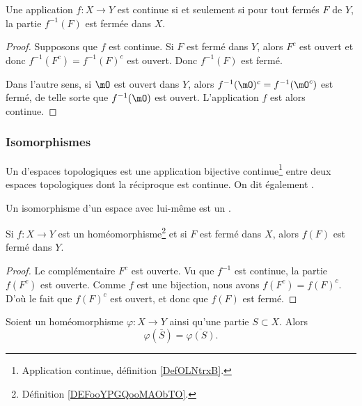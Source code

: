 \begin{lemma}       \label{LEMooATLRooEKnlro}
	Une application \( f\colon X\to Y\) est continue si et seulement si pour tout fermés \( F\) de \( Y\), la partie \(f^{-1}(F) \) est fermée dans \( X\).
\end{lemma}

\begin{proof}
	Supposons que \( f\) est continue. Si \( F\) est fermé dans \( Y\), alors \( F^c\) est ouvert et donc \( f^{-1}(F^c)=f^{-1}(F)^c\) est ouvert. Donc \( f^{-1}(F)\) est fermé.

	Dans l'autre sens, si \( \mO\) est ouvert dans \( Y\), alors \( f^{-1}(\mO)^c=f^{-1}(\mO^c)\) est fermé, de telle sorte que \( f^{-1}(\mO)\) est ouvert. L'application \( f\) est alors continue.
\end{proof}


\subsubsection{Isomorphismes}

\begin{definition}      \label{DEFooYPGQooMAObTO}
	Un  d'espaces topologiques est une application bijective continue\footnote{Application continue, définition \ref{DefOLNtrxB}.} entre deux espaces topologiques dont la réciproque est continue. On dit également .

	Un isomorphisme d'un espace avec lui-même est un .
\end{definition}


\begin{lemma}        \label{LEMooMJSHooOszteq}
	Si \( f\colon X\to Y\) est un homéomorphisme\footnote{Définition \ref{DEFooYPGQooMAObTO}.} et si \( F\) est fermé dans \( X\), alors \( f(F)\) est fermé dans \( Y\).
\end{lemma}

\begin{proof}
	Le complémentaire \( F^c\) est ouverte. Vu que \( f^{-1}\) est continue, la partie \( f(F^c)\) est ouverte. Comme \( f\) est une bijection, nous avons \( f(F^c)=f(F)^c\). D'où le fait que \( f(F)^c\) est ouvert, et donc que \( f(F)\) est fermé.
\end{proof}


\begin{lemma}		\label{LEMooNMPGooRlgppQ}
	Soient un homéomorphisme \(\varphi \colon X\to Y  \) ainsi qu'une partie \( S\subset X\). Alors
	\begin{equation}
		\varphi(\bar S)=\overline{\varphi(S)}.
	\end{equation}
\end{lemma}

